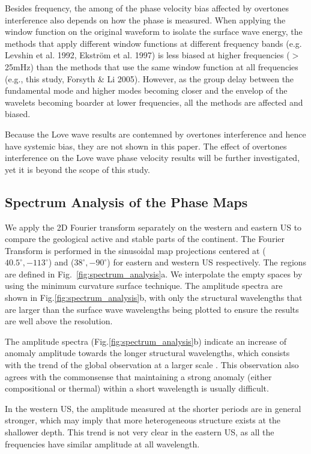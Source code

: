 \documentclass[referee]{gji}
\begin{document}
{{Besides frequency, the among of the phase velocity bias affected by overtones interference also depends on how the phase is measured. When applying the window function on the original waveform to isolate the surface wave energy, the methods that apply different window functions at different frequency bands (e.g. Levshin et al. 1992, Ekstr\"{o}m et al. 1997) is less biased at higher frequencies ($>$25mHz) than the methods that use the same window function at all frequencies (e.g., this study, Forsyth \& Li 2005). However, as the group delay between the fundamental mode and higher modes becoming closer and the envelop of the wavelets becoming boarder at lower frequencies, all the methods are affected and biased.

Because the Love wave results are contemned by overtones interference and hence have systemic bias, they are not shown in this paper. The effect of overtones interference on the Love wave phase velocity results will be further investigated, yet it is beyond the scope of this study.

\subsection{Spectrum Analysis of the Phase Maps}

We apply the 2D Fourier transform separately on the western and eastern US to compare the geological active and stable parts of the continent. The Fourier Transform is performed in the sinusoidal map projections centered at ($40.5^\circ,-113^\circ$) and ($38^\circ,-90^\circ$) for eastern and western US respectively. The regions are defined in Fig.~\ref{fig:spectrum_analysis}a. We interpolate the empty spaces by using the minimum curvature surface technique. The amplitude spectra are shown in Fig.\ref{fig:spectrum_analysis}b, with only the structural wavelengths that are larger than the surface wave wavelengths being plotted to ensure the results are well above the resolution. 

The amplitude spectra (Fig.\ref{fig:spectrum_analysis}b) indicate an increase of anomaly amplitude towards the longer structural wavelengths, which consists with the trend of the global observation at a larger scale \cite{Dziewonski:2010ma}. This observation also agrees with the commonsense that maintaining a strong anomaly (either compositional or thermal) within a short wavelength is usually difficult. 

In the western US, the amplitude measured at the shorter periods are in general stronger, which may imply that more heterogeneous structure exists at the shallower depth. This trend is not very clear in the eastern US, as all the frequencies have similar amplitude at all wavelength. 

}}
\end{document}
